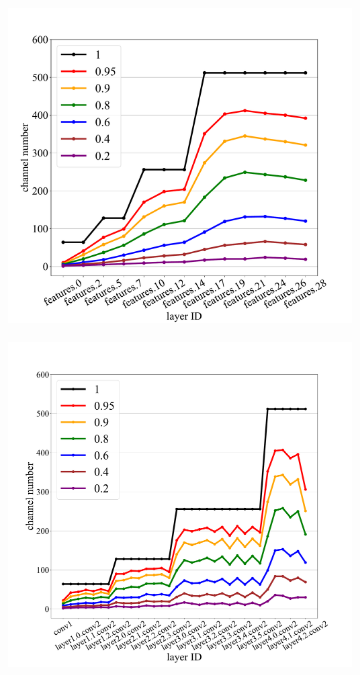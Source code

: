 \documentclass[sigconf, 10pt]{acmart}
\begin{document}
\begin{figure}
  \centering
  \begin{subfigure}{1\linewidth}
  \centering
    \includegraphics[width=\linewidth]{Fig6a.pdf}
    \caption{}
    \label{fig:6a}
  \end{subfigure}
  \vspace{0.2pt}
  \begin{subfigure}{1\linewidth}
  \centering
    \includegraphics[width=\linewidth]{fig6b.pdf}

\end{subfigure}
\end{figure}
\end{document}

